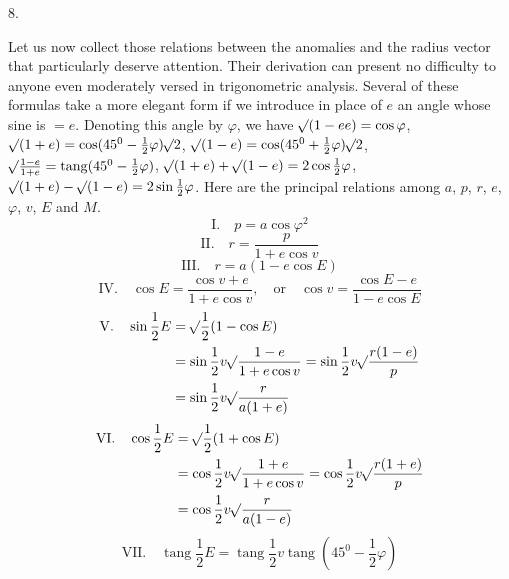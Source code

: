 \par{}
\begin{center}
8.
\end{center}
Let us now collect those relations between the anomalies and the radius vector that
particularly deserve attention. Their derivation can present no difficulty to anyone
even moderately versed in trigonometric analysis. Several of these formulas take a
more elegant form if we introduce in place of $e$ an angle whose sine is $=e$.
Denoting this angle by $\varphi$, we have $\mathord{{}^{}\!\surd}(1-ee)=\cos\varphi$, \mbox{$\mathord{{}^{}\!\surd}(1+e)=\cos(45^0-\frac{1}{2}\varphi)\mathord{{}^{}\!\surd}2$}, $\mathord{{}^{}\!\surd}(1-e)=\cos(45^0+\frac{1}{2}\varphi)\mathord{{}^{}\!\surd}2$, $\mathord{{}^{}\!\surd}\frac{1-e}{1+e}=\operatorname{tang}(45^0-\frac{1}{2}\varphi)$, $\mathord{{}^{}\!\surd}(1+e)+\mathord{{}^{}\!\surd}(1-e)=2\cos\frac{1}{2}\varphi$, $\mathord{{}^{}\!\surd}(1+e)-\mathord{{}^{}\!\surd}(1-e)=2\sin\frac{1}{2}\varphi$. Here are the principal relations among $a$, $p$, $r$, $e$, $\varphi$, $v$, $E$ and $M$.\HistoricalNoteEight{Manuscript note:]
\[
\begin{gathered}
1=\cos v\cos E+\frac{\sin v\sin E}{\cos\varphi},\\
\cos\varphi=\frac{\sin v\sin E}{1-\cos v\cos E},\\
\sin\varphi=\frac{\cos E-\cos v}{1-\cos v\cos E}\cdot
\end{gathered}
\]
}
\[
\mathrm{I.}\quad p=a\cos\varphi^2
\]
\[
\mathrm{II.}\quad r=\frac{p}{1+e\cos v}
\]
\[
\mathrm{III.}\quad r=a(1-e\cos E)
\]
\[
\mathrm{IV.}\quad \cos E=\frac{\cos v+e}{1+e\cos v},\quad\mathrm{or}\quad\cos v=\frac{\cos E-e}{1-e\cos E}
\]
\[
\begin{aligned}
\mathrm{V.}\quad\sin\frac{1}{2}E&=\mathord{{}^{}\!\surd}\frac{1}{2}(1-\cos E)\\
&=\sin\frac{1}{2}v\mathord{{}^{}\!\surd}\frac{1-e}{1+e\cos v}=\sin\frac{1}{2}v\mathord{{}^{}\!\surd}\frac{r(1-e)}{p}\\
&=\sin\frac{1}{2}v\mathord{{}^{}\!\surd}\frac{r}{a(1+e)}
\end{aligned}
\]
\[
\begin{aligned}
\mathrm{VI.}\quad\cos\frac{1}{2}E&=\mathord{{}^{}\!\surd}\frac{1}{2}(1+\cos E)\\
&=\cos\frac{1}{2}v\mathord{{}^{}\!\surd}\frac{1+e}{1+e\cos v}=\cos\frac{1}{2}v\mathord{{}^{}\!\surd}\frac{r(1+e)}{p}\\
&=\cos\frac{1}{2}v\mathord{{}^{}\!\surd}\frac{r}{a(1-e)}
\end{aligned}
\]
\[
\mathrm{VII.}\quad\operatorname{tang}\frac{1}{2}E=\operatorname{tang}\frac{1}{2}v\operatorname{tang}(45^0-\frac{1}{2}\varphi)
\]

